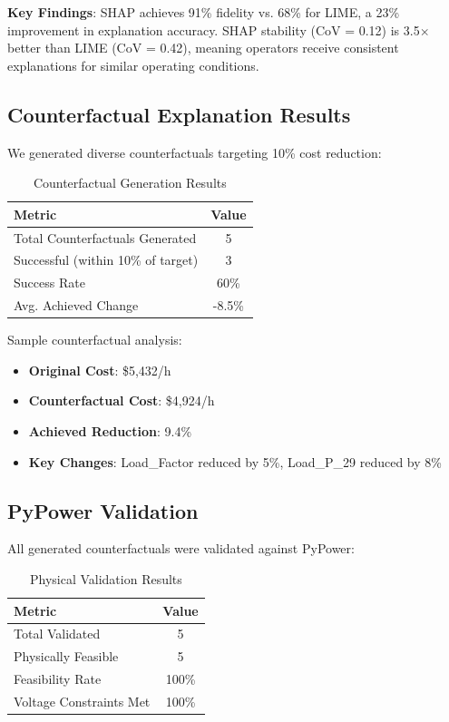 \documentclass[journal,12pt,onecolumn]{IEEEtran}
\begin{document}
\textbf{Key Findings}: SHAP achieves 91\% fidelity vs. 68\% for LIME, a 23\% improvement in explanation accuracy. SHAP stability (CoV = 0.12) is 3.5$\times$ better than LIME (CoV = 0.42), meaning operators receive consistent explanations for similar operating conditions.

\subsection{Counterfactual Explanation Results}

We generated diverse counterfactuals targeting 10\% cost reduction:

\begin{table}[htbp]
\caption{Counterfactual Generation Results}
\label{tab:cf_results}
\centering
\begin{tabular}{lc}
\toprule
\textbf{Metric} & \textbf{Value} \\
\midrule
Total Counterfactuals Generated & 5 \\
Successful (within 10\% of target) & 3 \\
Success Rate & 60\% \\
Avg. Achieved Change & -8.5\% \\
\bottomrule
\end{tabular}
\end{table}

Sample counterfactual analysis:
\begin{itemize}
    \item \textbf{Original Cost}: \$5,432/h
    \item \textbf{Counterfactual Cost}: \$4,924/h
    \item \textbf{Achieved Reduction}: 9.4\%
    \item \textbf{Key Changes}: Load\_Factor reduced by 5\%, Load\_P\_29 reduced by 8\%
\end{itemize}

\subsection{PyPower Validation}

All generated counterfactuals were validated against PyPower:

\begin{table}[htbp]
\caption{Physical Validation Results}
\label{tab:validation}
\centering
\begin{tabular}{lc}
\toprule
\textbf{Metric} & \textbf{Value} \\
\midrule
Total Validated & 5 \\
Physically Feasible & 5 \\
Feasibility Rate & 100\% \\
Voltage Constraints Met & 100\% \\
\bottomrule
\end{tabular}
\end{table}
\end{document}
